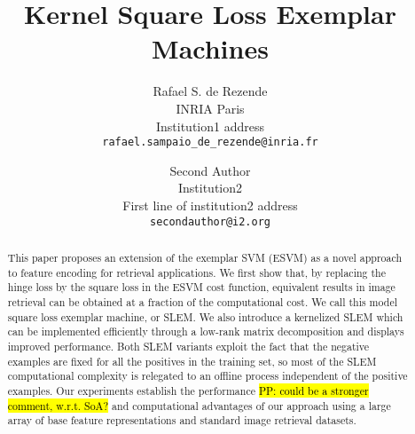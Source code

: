 \documentclass[10pt,twocolumn,letterpaper]{article}
\newcommand{\hlc}[2][yellow]{{\sethlcolor{#1}\hl{#2}}}
\newcommand{\PP}[1]{\hlc[green]{PP: #1}}
\begin{document}
\title{Kernel Square Loss Exemplar Machines}

\author{Rafael S. de Rezende\\
INRIA Paris\\
Institution1 address\\
{\tt\small rafael.sampaio_de_rezende@inria.fr}
\and
Second Author\\
Institution2\\
First line of institution2 address\\
{\tt\small secondauthor@i2.org}
}

\maketitle
\begin{abstract}
This paper proposes an extension of the exemplar SVM (ESVM) as a novel approach to feature encoding for retrieval applications.
We first show that, by replacing the hinge loss by the square loss in the ESVM cost function, equivalent results in image retrieval can be obtained at a fraction of the computational cost. 
We call this model square loss exemplar machine, or SLEM. 
We also introduce a kernelized SLEM which can be implemented efficiently through a low-rank matrix decomposition and
displays improved performance. 
Both SLEM variants exploit the fact that the negative examples are fixed for all the positives in the training set, so most of the SLEM computational complexity is relegated to an offline process independent of the positive examples. 
Our experiments establish the performance \PP{could be a stronger comment, w.r.t. SoA?} and computational advantages of our approach using a large array of base feature representations and standard image retrieval datasets.
\end{abstract}



%









%



{\small
 

}
\end{document}
